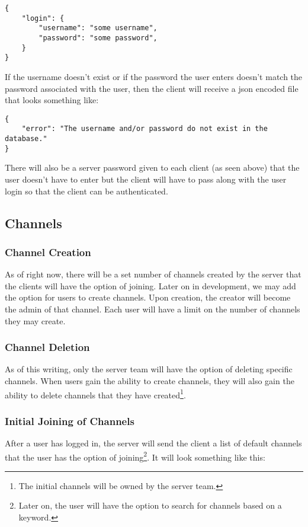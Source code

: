 \begin{lstlisting}[style=json]
{
    "login": {
        "username": "some username",
        "password": "some password",
    }
}
\end{lstlisting}

If the username doesn't exist or if the password the user enters doesn't match the password associated with the user, then the client will receive a \gls{json} encoded file that looks something like:

\begin{lstlisting}[style=json]
{
    "error": "The username and/or password do not exist in the database."
}
\end{lstlisting}

There will also be a server password given to each client (as seen above) that the user doesn't have to enter but the client will have to pass along with the user login so that the client can be authenticated.

\subsection{Channels}
\subsubsection{Channel Creation}
As of right now, there will be a set number of channels created by the server that the clients will have the option of joining. Later on in development, we may add the option for users to create channels. Upon creation, the creator will become the admin of that channel. Each user will have a limit on the number of channels they may create.

\subsubsection{Channel Deletion}
As of this writing, only the server team will have the option of deleting specific channels. When users gain the ability to create channels, they will also gain the ability to delete channels that they have created\footnote{The initial channels will be owned by the server team.}.

\subsubsection{Initial Joining of Channels}
After a user has logged in, the server will send the client a list of default channels that the user has the option of joining\footnote{Later on, the user will have the option to search for channels based on a keyword.}. It will look something like this:

